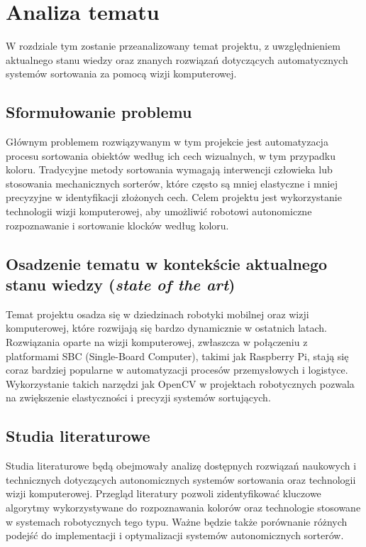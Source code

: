 \chapter{Analiza tematu}
\label{ch:analiza}

W rozdziale tym zostanie przeanalizowany temat projektu, z uwzględnieniem aktualnego stanu wiedzy oraz znanych rozwiązań dotyczących automatycznych systemów sortowania za pomocą wizji komputerowej.

\section{Sformułowanie problemu}
\label{sec:sformulowanie_problemu}

Głównym problemem rozwiązywanym w tym projekcie jest automatyzacja procesu sortowania obiektów według ich cech wizualnych, w tym przypadku koloru. Tradycyjne metody sortowania wymagają interwencji człowieka lub stosowania mechanicznych sorterów, które często są mniej elastyczne i mniej precyzyjne w identyfikacji złożonych cech. Celem projektu jest wykorzystanie technologii wizji komputerowej, aby umożliwić robotowi autonomiczne rozpoznawanie i sortowanie klocków według koloru.

\section{Osadzenie tematu w kontekście aktualnego stanu wiedzy (\textit{state of the art})}
\label{sec:state_of_the_art}

Temat projektu osadza się w dziedzinach robotyki mobilnej oraz wizji komputerowej, które rozwijają się bardzo dynamicznie w ostatnich latach. Rozwiązania oparte na wizji komputerowej, zwłaszcza w połączeniu z platformami SBC (Single-Board Computer), takimi jak Raspberry Pi, stają się coraz bardziej popularne w automatyzacji procesów przemysłowych i logistyce. Wykorzystanie takich narzędzi jak OpenCV w projektach robotycznych pozwala na zwiększenie elastyczności i precyzji systemów sortujących.

\section{Studia literaturowe}
\label{sec:studia_literaturowe}

Studia literaturowe będą obejmowały analizę dostępnych rozwiązań naukowych i technicznych dotyczących autonomicznych systemów sortowania oraz technologii wizji komputerowej. Przegląd literatury pozwoli zidentyfikować kluczowe algorytmy wykorzystywane do rozpoznawania kolorów oraz technologie stosowane w systemach robotycznych tego typu. Ważne będzie także porównanie różnych podejść do implementacji i optymalizacji systemów autonomicznych sorterów.

\cite{bib:manualarduino,bib:manualLibcamera2,bib:artykul,bib:artykul1,bib:artykul2,bib:ksiazka,bib:konferencja,bib:internet}
